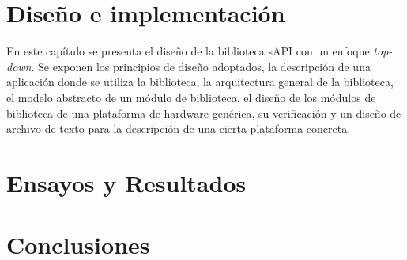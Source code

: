 \documentclass[
11pt, %
spanish,
singlespacing, %
parskip, %
headsepline, %
]{MastersDoctoralThesis} %
\begin{document}
\chapter{Diseño e implementación}
\label{ChapterDiseno}

En este capítulo se presenta el diseño de la biblioteca sAPI con un enfoque \emph{top-down}. Se exponen los principios de diseño adoptados, la descripción de una aplicación donde se utiliza la biblioteca, la arquitectura general de la biblioteca, el modelo abstracto de un módulo de biblioteca, el diseño de los módulos de biblioteca de una plataforma de hardware genérica, su verificación y un diseño de archivo de texto para la descripción de una cierta plataforma concreta.





 




 

%


%
%
%
%
%



\chapter{Ensayos y Resultados}
\label{ChapterEnsayosYResultados}



\chapter{Conclusiones} %
\label{ChapterConclusiones} 
\end{document}
